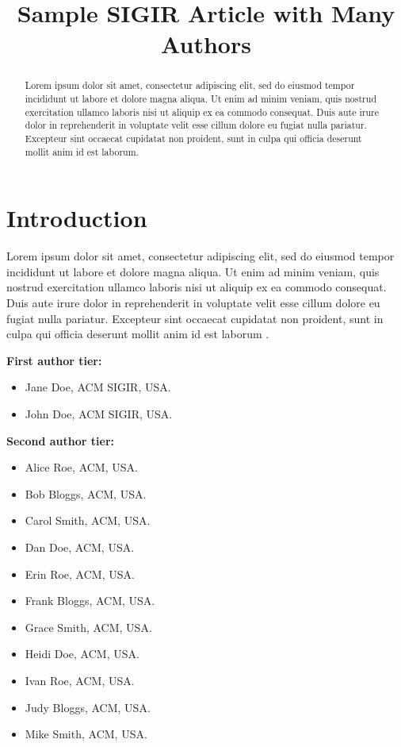 \documentclass[paper]{sigirforum}
\begin{document}
\title{Sample SIGIR Article with Many Authors}


\maketitle 
\begin{abstract}
Lorem ipsum dolor sit amet, consectetur adipiscing elit, sed do eiusmod tempor incididunt ut labore et dolore magna aliqua. Ut enim ad minim veniam, quis nostrud exercitation ullamco laboris nisi ut aliquip ex ea commodo consequat. Duis aute irure dolor in reprehenderit in voluptate velit esse cillum dolore eu fugiat nulla pariatur. Excepteur sint occaecat cupidatat non proident, sunt in culpa qui officia deserunt mollit anim id est laborum.
\end{abstract}

\section{Introduction}

Lorem ipsum dolor sit amet, consectetur adipiscing elit, sed do eiusmod tempor incididunt ut labore et dolore magna aliqua. Ut enim ad minim veniam, quis nostrud exercitation ullamco laboris nisi ut aliquip ex ea commodo consequat. Duis aute irure dolor in reprehenderit in voluptate velit esse cillum dolore eu fugiat nulla pariatur. Excepteur sint occaecat cupidatat non proident, sunt in culpa qui officia deserunt mollit anim id est laborum \citep{forum}.

\appendixauthorothers

\textbf{First author tier:}
\begin{itemize}
	\item Jane Doe, ACM SIGIR, USA.
	\item John Doe, ACM SIGIR, USA.
\end{itemize}

\textbf{Second author tier:}
\begin{itemize}
	\item Alice Roe, ACM, USA.
	\item Bob Bloggs, ACM, USA.
	\item Carol Smith, ACM, USA.
	\item Dan Doe, ACM, USA.
	\item Erin Roe, ACM, USA.
	\item Frank Bloggs, ACM, USA.
	\item Grace Smith, ACM, USA.
	\item Heidi Doe, ACM, USA.
	\item Ivan Roe, ACM, USA.
	\item Judy Bloggs, ACM, USA.
	\item Mike Smith, ACM, USA.
\end{itemize}


\end{document}
